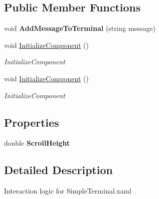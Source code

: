 \subsection*{Public Member Functions}
\begin{DoxyCompactItemize}
\item 
void {\bfseries Add\+Message\+To\+Terminal} (string message)\hypertarget{class_power_system_planning_wpf_app_1_1_control_utils_1_1_simple_terminal_a26cf665eb458128a13e724fdd54f4ec0}{}\label{class_power_system_planning_wpf_app_1_1_control_utils_1_1_simple_terminal_a26cf665eb458128a13e724fdd54f4ec0}

\item 
void \hyperlink{class_power_system_planning_wpf_app_1_1_control_utils_1_1_simple_terminal_a87d7756e060b71939deecee9453d1eac}{Initialize\+Component} ()
\begin{DoxyCompactList}\small\item\em Initialize\+Component \end{DoxyCompactList}\item 
void \hyperlink{class_power_system_planning_wpf_app_1_1_control_utils_1_1_simple_terminal_a87d7756e060b71939deecee9453d1eac}{Initialize\+Component} ()
\begin{DoxyCompactList}\small\item\em Initialize\+Component \end{DoxyCompactList}\end{DoxyCompactItemize}
\subsection*{Properties}
\begin{DoxyCompactItemize}
\item 
double {\bfseries Scroll\+Height}\hypertarget{class_power_system_planning_wpf_app_1_1_control_utils_1_1_simple_terminal_ae5f720d73de5ccec6fb9cf1780fa52dc}{}\label{class_power_system_planning_wpf_app_1_1_control_utils_1_1_simple_terminal_ae5f720d73de5ccec6fb9cf1780fa52dc}

\end{DoxyCompactItemize}


\subsection{Detailed Description}
Interaction logic for Simple\+Terminal.\+xaml 

